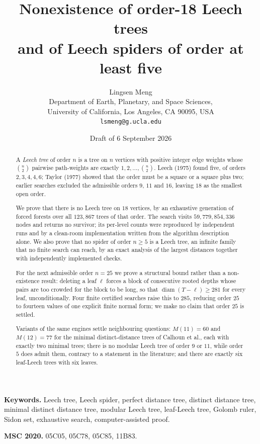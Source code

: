 \documentclass[11pt,a4paper]{article}
\title{Nonexistence of order-18 Leech trees\\[3pt]
  \large and of Leech spiders of order at least five}
\author{Lingsen Meng\\[2pt]
  \small Department of Earth, Planetary, and Space Sciences,\\[-2pt]
  \small University of California, Los Angeles, CA 90095, USA\\[-2pt]
  \small \texttt{lsmeng@g.ucla.edu}}
\date{Draft of 6 September 2026}
\theoremstyle{plain}
\theoremstyle{remark}
\newcommand{\bin}[2]{\binom{#1}{#2}}
\newcommand{\diam}{\operatorname{diam}}
\begin{document}
\maketitle

\begin{abstract}
A \emph{Leech tree} of order $n$ is a tree on $n$ vertices with positive integer
edge weights whose $\bin n2$ pairwise path-weights are exactly $1,2,\dots,\bin n2$.
Leech (1975) found five, of orders $2,3,4,4,6$; Taylor (1977) showed that the
order must be a square or a square plus two; earlier searches excluded the
admissible orders $9$, $11$ and $16$, leaving $18$ as the smallest open order.

We prove that there is no Leech tree on $18$ vertices, by an exhaustive
generation of forced forests over all $123{,}867$ trees of that order.  The
search visits $59{,}779{,}854{,}336$ nodes and returns no survivor; its
per-level counts were reproduced by independent runs and by a clean-room
implementation written from the algorithm description alone.  We also prove
that no spider of order $n\ge5$ is a Leech tree, an infinite family that no
finite search can reach, by an exact analysis of the largest distances together
with independently implemented checks.

For the next admissible order $n=25$ we prove a structural bound rather than a
non-existence result: deleting a leaf $\ell$ forces a block of consecutive
rooted depths whose pairs are too crowded for the block to be long, so that
$\diam(T-\ell)\ge281$ for every leaf, unconditionally.  Four finite certified
searches raise this to $285$, reducing order $25$ to fourteen values of one
explicit finite normal form; we make no claim that order $25$ is settled.

Variants of the same engines settle neighbouring questions: $M(11)=60$ and
$M(12)=77$ for the minimal distinct-distance trees of Calhoun et al., each with
exactly two minimal trees; there is no modular Leech tree of order $9$ or $11$,
while order $5$ does admit them, contrary to a statement in the literature; and
there are exactly six leaf-Leech trees with six leaves.
\end{abstract}

\noindent\textbf{Keywords.} Leech tree, Leech spider, perfect distance tree,
distinct distance tree, minimal distinct distance tree, modular Leech tree, leaf-Leech tree,
Golomb ruler, Sidon set, exhaustive search, computer-assisted proof.

\noindent\textbf{MSC 2020.} 05C05, 05C78, 05C85, 11B83.
\end{document}
